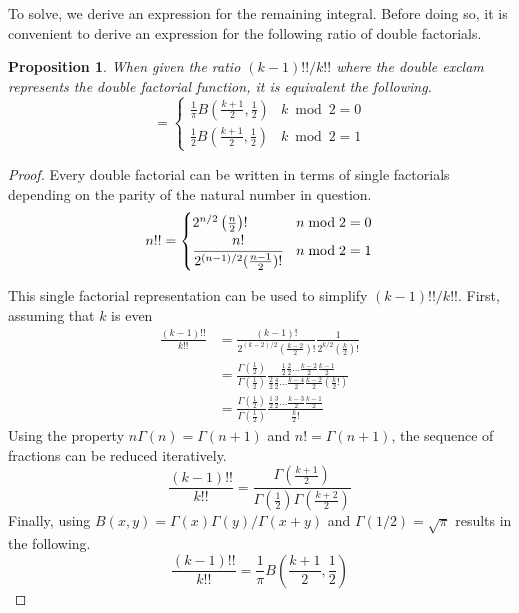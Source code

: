 \documentclass{article}
\newtheorem{proposition}{Proposition}
\begin{document}
To solve, we derive an expression for the remaining integral. Before doing so, it is convenient to derive an expression for the following
ratio of double factorials.
\begin{proposition} \label{prop:double fac beta}
	When given the ratio $(k-1)!!/k!!$ where the double exclam represents the double factorial function, it is equivalent the following.
	\begin{equation}
		= \begin{cases}
			\frac{1}{\pi}B(\frac{k+1}{2}, \frac{1}{2}) & k\bmod 2=0\\
			\frac{1}{2}B(\frac{k+1}{2}, \frac{1}{2}) & k\bmod 2=1
		\end{cases}
	\end{equation}
\end{proposition}
\begin{proof}
	Every double factorial can be written in terms of single factorials depending on the parity of the natural number in question.
	\begin{equation} \label{eq:single factorial}
		n!! = \begin{cases}
			2^{n/2}\left(\frac{n}{2}\right)! & n \bmod 2 = 0 \\
			\cfrac{n!}{2^{(n-1)/2}(\frac{n-1}{2})!} & n \bmod 2 = 1
		\end{cases}
	\end{equation}

	This single factorial representation can be used to simplify $(k-1)!!/k!!$. First, assuming that $k$ is even
	\begin{align}
		\frac{(k-1)!!}{k!!} &= \frac{(k-1)!}{2^{(k-2)/2}(\frac{k-2}{2})!}\frac{1}{2^{k/2}(\frac{k}{2})!} \\
		&= \frac{\Gamma(\frac{1}{2})}{\Gamma(\frac{1}{2})}\frac{\frac{1}{2}\frac{2}{2}\hdots\frac{k-2}{2}\frac{k-1}{2}}{\frac{2}{2}\frac{4}{2}\hdots\frac{k-4}{2}\frac{k-2}{2}(\frac{k}{2}!)} \\
		&= \frac{\Gamma(\frac{1}{2})}{\Gamma(\frac{1}{2})}\frac{\frac{1}{2}\frac{3}{2}\hdots\frac{k-3}{2}\frac{k-1}{2}}{\frac{k}{2}!}
	\end{align}
	Using the property $n\Gamma(n)=\Gamma(n+1)$ and $n! = \Gamma(n+1)$, the sequence of fractions can be reduced iteratively.
	\begin{equation}
		\frac{(k-1)!!}{k!!} = \frac{\Gamma(\frac{k+1}{2})}{\Gamma(\frac{1}{2})\Gamma(\frac{k+2}{2})}
	\end{equation}
	Finally, using $B(x,y)=\Gamma(x)\Gamma(y)/\Gamma(x+y)$ and $\Gamma(1/2) = \sqrt{\pi}$ results in the following.
	\begin{equation}
		\frac{(k-1)!!}{k!!} = \frac{1}{\pi}B\left(\frac{k+1}{2}, \frac{1}{2}\right)
	\end{equation}


\end{proof}
\end{document}

